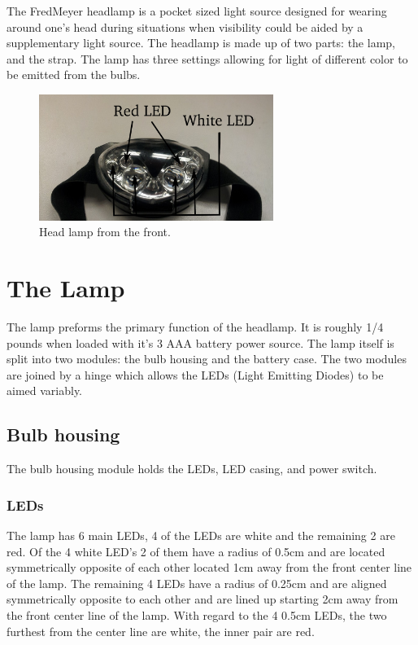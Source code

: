 \documentclass[12pt]{article}
\begin{document}
The FredMeyer headlamp is a pocket sized light source designed for wearing around one's head during
situations when visibility could be aided by a supplementary light source. The headlamp is made up
of two parts: the lamp, and the strap. The lamp has three settings allowing for light of different
color to be emitted from the bulbs.

\begin{figure}[h!]
\centering
\caption{Head lamp from the front.}
\includegraphics[width=3in]{headlamp}
\end{figure}

\section{The Lamp}
The lamp preforms the primary function of the headlamp. It is roughly 1/4 pounds when loaded with
it's 3 AAA battery power source. The lamp itself is split into two modules: the bulb housing and the
battery case. The two modules are joined by a hinge which allows the LEDs (Light Emitting Diodes)
to be aimed variably.

\subsection{Bulb housing}
The bulb housing module holds the LEDs, LED casing, and power switch.

\subsubsection{LEDs}
The lamp has 6 main LEDs, 4 of the LEDs are white and the remaining 2 are red. Of the 4 white LED's
2 of them have a radius of 0.5cm and are located symmetrically opposite of each other located 1cm
away from the front center line of the lamp.  The remaining 4 LEDs have a radius of 0.25cm and are
aligned symmetrically opposite to each other and are lined up starting 2cm away from the front
center line of the lamp. With regard to the 4 0.5cm LEDs, the two furthest from the center line are
white, the inner pair are red.
\end{document}
